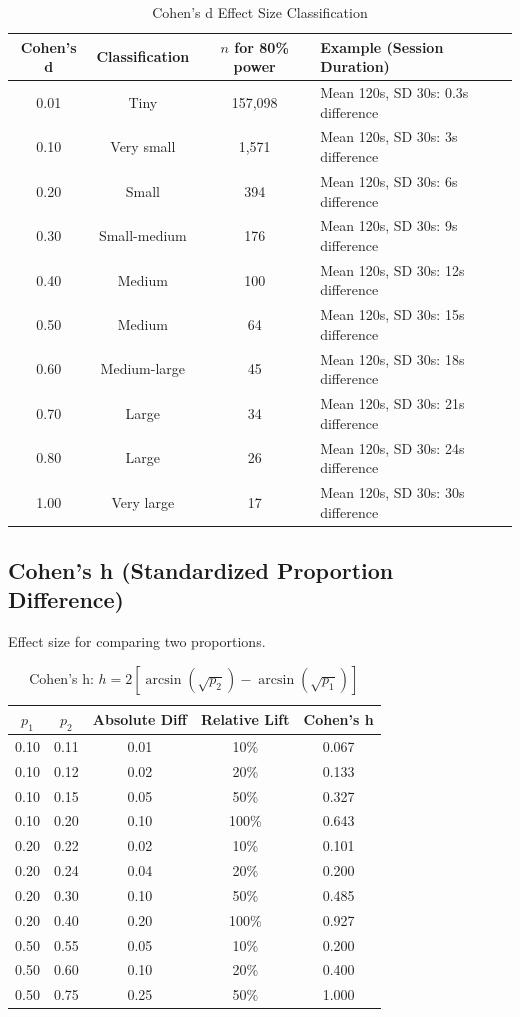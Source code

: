 \begin{table}[h]
\centering
\caption{Cohen's d Effect Size Classification}
\begin{tabular}{cccp{6cm}}
\toprule
\textbf{Cohen's d} & \textbf{Classification} & \textbf{$n$ for 80\% power} & \textbf{Example (Session Duration)} \\
\midrule
0.01 & Tiny & 157,098 & Mean 120s, SD 30s: 0.3s difference \\
0.10 & Very small & 1,571 & Mean 120s, SD 30s: 3s difference \\
0.20 & Small & 394 & Mean 120s, SD 30s: 6s difference \\
0.30 & Small-medium & 176 & Mean 120s, SD 30s: 9s difference \\
0.40 & Medium & 100 & Mean 120s, SD 30s: 12s difference \\
0.50 & Medium & 64 & Mean 120s, SD 30s: 15s difference \\
0.60 & Medium-large & 45 & Mean 120s, SD 30s: 18s difference \\
0.70 & Large & 34 & Mean 120s, SD 30s: 21s difference \\
0.80 & Large & 26 & Mean 120s, SD 30s: 24s difference \\
1.00 & Very large & 17 & Mean 120s, SD 30s: 30s difference \\
\bottomrule
\end{tabular}
\end{table}

\subsection{Cohen's h (Standardized Proportion Difference)}

Effect size for comparing two proportions.

\begin{table}[h]
\centering
\caption{Cohen's h: $h = 2[\arcsin(\sqrt{p_2}) - \arcsin(\sqrt{p_1})]$}
\begin{tabular}{ccccc}
\toprule
\textbf{$p_1$} & \textbf{$p_2$} & \textbf{Absolute Diff} & \textbf{Relative Lift} & \textbf{Cohen's h} \\
\midrule
0.10 & 0.11 & 0.01 & 10\% & 0.067 \\
0.10 & 0.12 & 0.02 & 20\% & 0.133 \\
0.10 & 0.15 & 0.05 & 50\% & 0.327 \\
0.10 & 0.20 & 0.10 & 100\% & 0.643 \\
0.20 & 0.22 & 0.02 & 10\% & 0.101 \\
0.20 & 0.24 & 0.04 & 20\% & 0.200 \\
0.20 & 0.30 & 0.10 & 50\% & 0.485 \\
0.20 & 0.40 & 0.20 & 100\% & 0.927 \\
0.50 & 0.55 & 0.05 & 10\% & 0.200 \\
0.50 & 0.60 & 0.10 & 20\% & 0.400 \\
0.50 & 0.75 & 0.25 & 50\% & 1.000 \\
\bottomrule
\end{tabular}
\end{table}

